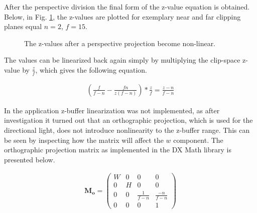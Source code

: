 After the perspective division the final form of the z-value equation is obtained. Below, in Fig. \ref{plot:perspective_z}, the z-values are plotted for exemplary near and far clipping planes equal \(n=2\), \(f=15\).

\begin{figure}[h]
    \centering
    \caption{The z-values after a perspective projection become non-linear.}
    \label{plot:perspective_z}
\end{figure}

The values can be linearized back again simply by multiplying the clip-space z-value by \(\frac{z}{f}\), which gives the following equation.

\begin{align}
	\label{eq:projection_linearization}
	\left(\frac{f}{f-n} - \frac{fn}{z(f-n)}\right) * \frac{z}{f} = \frac{z-n}{f-n}
\end{align}

In the application z-buffer linearization was not implemented, as after investigation it turned out that an orthographic projection, which is used for the directional light, does not introduce nonlinearity to the z-buffer range. This can be seen by inspecting how the matrix will affect the \(w\) component. The orthographic projection matrix as implemented in the DX Math library is presented below.

\begin{align}
	\label{eq:projection_ortho}
	\mathbf{M_{o}} = 
	\begin{pmatrix}
		W & 0 & 0 & 0\\
		0 & H & 0 & 0\\
		0 & 0 & \frac{1}{f-n} & \frac{-n}{f-n}\\
		0 & 0 & 0 & 1
	\end{pmatrix}
\end{align}

